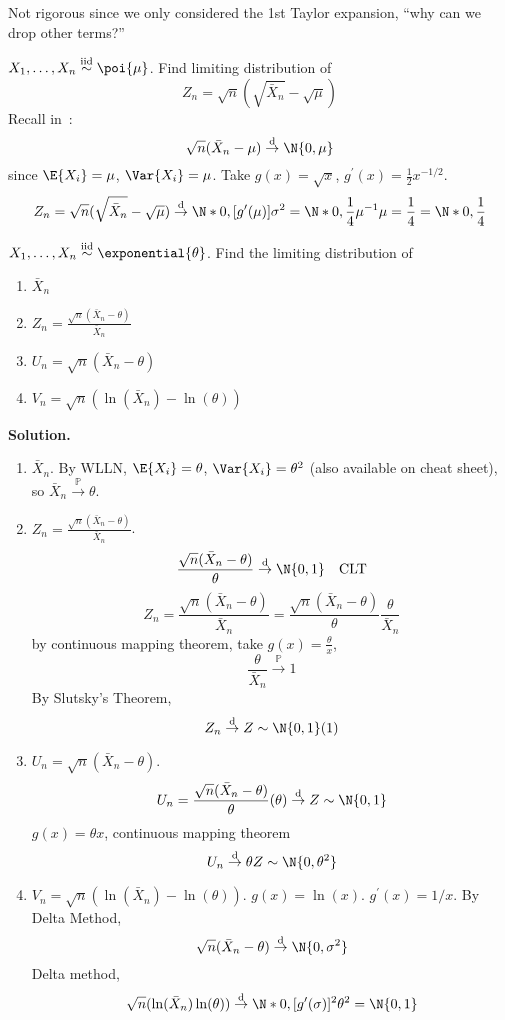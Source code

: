 Not rigorous since we only considered the 1st Taylor expansion,
``why can we drop other terms?''
\begin{Example}{}{}
    $ X_1,\ldots,X_n \stackrel{\text{iid}}{\sim}\poi{\mu} $.
    Find limiting distribution of
    \[ Z_n=\sqrt{n}(\sqrt{\bar{X}_n}-\sqrt{\mu}) \]
    Recall in~:
    \[ \sqrt{n}(\bar{X}_n-\mu)\stackrel{\text{d}}{\to}
        \N{0,\mu} \]
    since $ \E{X_i}=\mu $, $ \Var{X_i}=\mu $.
    Take $ g(x)=\sqrt{x} $, $ g^\prime(x)=\frac{1}{2} x^{-1/2} $.
    \[ Z_n=\sqrt{n}(\sqrt{\bar{X}_n}-\sqrt{\mu})\stackrel{\text{d}}{\to}
        \N*{0,[g^\prime(\mu)]\sigma^2}=
        \N*{0,\frac{1}{4}\mu^{-1}\mu=\frac{1}{4}}=\N*{0,\frac{1}{4}} \]
\end{Example}
\begin{Example}{}{}
    $ X_1,\ldots,X_n \stackrel{\text{iid}}{\sim}\exponential{\theta} $.
    Find the limiting distribution of
    \begin{enumerate}
        \item $ \bar{X}_n $
        \item $ \displaystyle Z_n=\frac{\sqrt{n}(\bar{X}_n-\theta)}{\bar{X}_n} $
        \item $ U_n=\sqrt{n}(\bar{X}_n-\theta) $
        \item $ V_n=\sqrt{n}(\ln(\bar{X}_n)-\ln(\theta)) $
    \end{enumerate}
    \textbf{Solution.}
    \begin{enumerate}
        \item $ \bar{X}_n $.
              By WLLN, $ \E{X_i}=\theta $, $ \Var{X_i}=\theta^2 $
              (also available on cheat sheet), so $ \bar{X}_n
                  \stackrel{\mathbb{P}}{\to}\theta $.
        \item $ \displaystyle Z_n=\frac{\sqrt{n}(\bar{X}_n-\theta)}{\bar{X}_n} $.
              \[ \frac{\sqrt{n}(\bar{X}_n-\theta)}{\theta} \stackrel{\text{d}}{\to}
                  \N{0,1}\quad \text{CLT} \]
              \[ Z_n=\frac{\sqrt{n}(\bar{X}_n-\theta)}{\bar{X}_n}=
                  \frac{\sqrt{n}(\bar{X}_n-\theta)}{\theta}\frac{\theta}{\bar{X}_n} \]
              by continuous mapping theorem, take $ g(x)=\frac{\theta}{x} $,
              \[ \frac{\theta}{\bar{X}_n}\stackrel{\mathbb{P}}{\to}1 \]
              By Slutsky's Theorem,
              \[ Z_n\stackrel{\text{d}}{\to}Z \sim \N{0,1}(1) \]
        \item $ U_n=\sqrt{n}(\bar{X}_n-\theta) $.
              \[ U_n=\frac{\sqrt{n}(\bar{X}_n-\theta)}{\theta}(\theta)
                  \stackrel{\text{d}}{\to}Z \sim \N{0,1}
              \]
              $ g(x)=\theta x $, continuous mapping theorem
              \[ U_n\stackrel{\text{d}}{\to}\theta Z \sim \N{0,\theta^2} \]
        \item $ V_n=\sqrt{n}(\ln(\bar{X}_n)-\ln(\theta)) $.
              $ g(x)=\ln(x) $. $ g^\prime(x)=1/x $. By Delta Method,
              \[ \sqrt{n}(\bar{X}_n-\theta)\stackrel{\text{d}}{\to}
                  \N{0,\sigma^2} \]
              Delta method,
              \[ \sqrt{n}(\ln(\bar{X}_n)\ln(\theta))
                  \stackrel{\text{d}}{\to}\N*{0,[g^\prime(\sigma)]^2\theta^2}=\N{0,1}
              \]
    \end{enumerate}
\end{Example}
